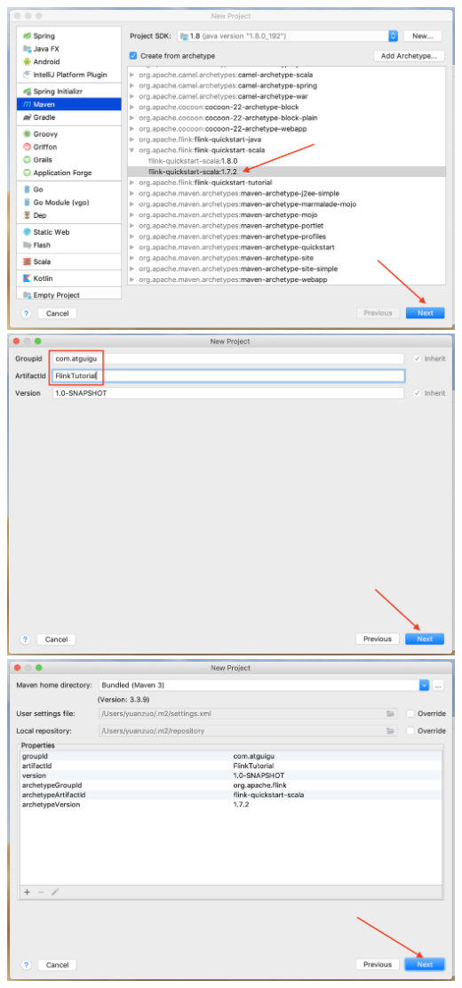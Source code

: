 \documentclass[oneside]{ctexbook}
\begin{document}
\noindent \includegraphics[width=\textwidth]{quickstart4.png}
\noindent \includegraphics[width=\textwidth]{quickstart5.png}
\noindent \includegraphics[width=\textwidth]{quickstart6.png}
\end{document}
